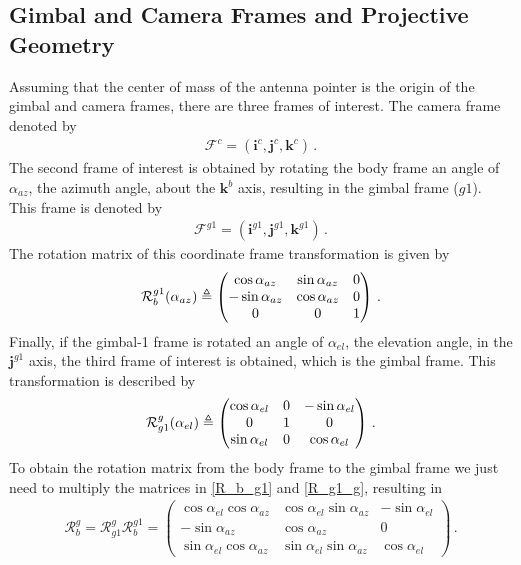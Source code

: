 \subsection{Gimbal and Camera Frames and Projective Geometry}{\label{sub:gimbal_camera_frames}}
Assuming that the center of mass of the antenna pointer is the origin of the gimbal and camera frames, there are three frames of interest. The camera frame denoted by
\begin{align*}
\mathcal{F}^c=(\boldsymbol{i}^c,\boldsymbol{j}^c,\boldsymbol{k}^c)\,.
\end{align*}
The second frame of interest is obtained by rotating the body frame an angle of $\alpha_{az}$, the azimuth angle, about the $\boldsymbol{k}^b$ axis, resulting in the gimbal frame (${g1}$). This frame is denoted by
\begin{align*}
\mathcal{F}^{g1}=(\boldsymbol{i}^{g1},\boldsymbol{j}^{g1},\boldsymbol{k}^{g1})\,.
\end{align*}
The rotation matrix of this coordinate frame transformation is given by
\begin{align}{\label{R_b_g1}}
\mathcal{R}_b^{g1}(\alpha_{az})\triangleq
\begin{pmatrix}
\cos\alpha_{az}  & \sin\alpha_{az} & 0 \\
-\sin\alpha_{az} & \cos\alpha_{az} & 0 \\
0				 & 0			   & 1
\end{pmatrix}\,.
\end{align}
Finally, if the gimbal-1 frame is rotated an angle of $\alpha_{el}$, the elevation angle, in the $\boldsymbol{j}^{g1}$ axis, the third frame of interest is obtained, which is the gimbal frame. This transformation is described by
\begin{align}{\label{R_g1_g}}
\mathcal{R}^g_{g1}(\alpha_{el})\triangleq
\begin{pmatrix}
\cos\alpha_{el} & 0 & -\sin\alpha_{el} \\
0				& 1 & 0				   \\
\sin\alpha_{el} & 0 & \cos\alpha_{el}
\end{pmatrix}\,.
\end{align} 
To obtain the rotation matrix from the body frame to the gimbal frame we just need to multiply the matrices in \ref{R_b_g1} and \ref{R_g1_g}, resulting in
\begin{align}
\mathcal{R}^g_{b}=\mathcal{R}^g_{g1}\mathcal{R}^{g1}_b=
\begin{pmatrix}
\cos\alpha_{el}\cos\alpha_{az} & \cos\alpha_{el}\sin\alpha_{az} & -\sin\alpha_{el} \\
-\sin\alpha_{az} 			   & \cos\alpha_{az} 			  	& 0 			   \\
\sin\alpha_{el}\cos\alpha_{az} & \sin\alpha_{el}\sin\alpha_{az} & \cos\alpha_{el}
\end{pmatrix}\,.
\end{align}

